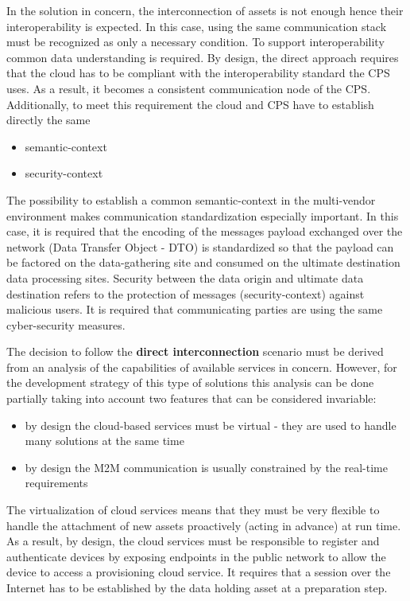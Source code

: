 \documentclass{article}
\begin{document}
In the solution in concern, the interconnection of assets is not enough hence their interoperability is expected. In this case, using the same communication stack must be recognized as only a necessary condition. To support interoperability common data understanding is required. By design, the direct approach requires that the cloud has to be compliant with the interoperability standard the CPS uses. As a result, it becomes a consistent communication node of the CPS. Additionally, to meet this requirement the cloud and CPS have to establish directly the same

\begin{itemize}
      \item semantic-context
      \item security-context
\end{itemize}

The possibility to establish a common semantic-context in the multi-vendor environment makes communication standardization especially important. In this case, it is required that the encoding of the messages payload exchanged over the network (Data Transfer Object - DTO) is standardized so that the payload can be factored on the data-gathering site and consumed on the ultimate destination data processing sites. Security between the data origin and ultimate data destination refers to the protection of messages (security-context) against malicious users. It is required that communicating parties are using the same cyber-security measures.

The decision to follow the \textbf{direct interconnection} scenario must be derived from an analysis of the capabilities of available services in concern. However, for the development strategy of this type of solutions this analysis can be done partially taking into account two features that can be considered invariable:

\begin{itemize}
      \item by design the cloud-based services must be virtual - they are used to handle many solutions at the same time
      \item by design the M2M communication is usually constrained by the real-time requirements
\end{itemize}

The virtualization of cloud services means that they must be very flexible to handle the attachment of new assets proactively (acting in advance) at run time. As a result, by design, the cloud services must be responsible to register and authenticate devices by exposing endpoints in the public network to allow the device to access a provisioning cloud service. It requires that a session over the Internet has to be established by the data holding asset at a preparation step.
\end{document}
